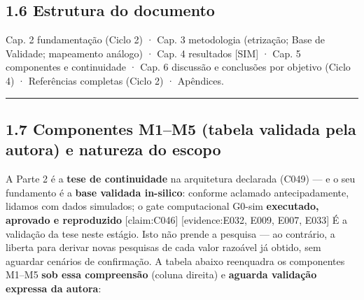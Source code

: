 \documentclass[
  12pt,
]{report}
\begin{document}
\hypertarget{estrutura-do-documento}{%
\subsection{1.6 Estrutura do documento}\label{estrutura-do-documento}}

Cap. 2 fundamentação (Ciclo 2) · Cap. 3 metodologia (etrização; Base de
Validade; mapeamento análogo) · Cap. 4 resultados {[}SIM{]} · Cap. 5
componentes e continuidade · Cap. 6 discussão e conclusões por objetivo
(Ciclo 4) · Referências completas (Ciclo 2) · Apêndices.

\begin{center}\rule{0.5\linewidth}{0.5pt}\end{center}

\hypertarget{componentes-m1m5-tabela-validada-pela-autora-e-natureza-do-escopo}{%
\subsection{1.7 Componentes M1--M5 (tabela validada pela autora) e
natureza do
escopo}\label{componentes-m1m5-tabela-validada-pela-autora-e-natureza-do-escopo}}

A Parte 2 é a \textbf{tese de continuidade} na arquitetura declarada
(C049) --- e o seu fundamento é a \textbf{base validada in-silico}:
conforme aclamado antecipadamente, lidamos com dados simulados; o gate
computacional G0-sim \textbf{executado, aprovado e reproduzido}
{[}claim:C046{]} {[}evidence:E032, E009, E007, E033{]} É a validação da
tese neste estágio. Isto não prende a pesquisa --- ao contrário, a
liberta para derivar novas pesquisas de cada valor razoável já obtido,
sem aguardar cenários de confirmação. A tabela abaixo reenquadra os
componentes M1--M5 \textbf{sob essa compreensão} (coluna direita) e
\textbf{aguarda validação expressa da autora}:
\end{document}
